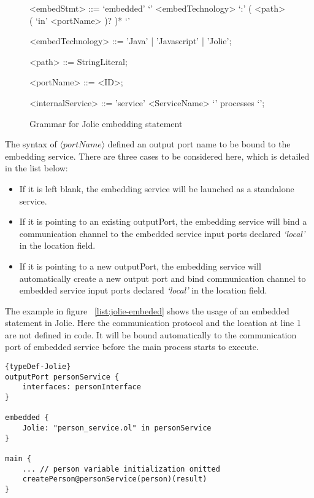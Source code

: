 \begin{figure}[ht]
    \begin{framed}
        \begin{grammar}
            <embedStmt> ::= `embedded' `{' <embedTechnology> `:' ( <path> ( `in' <portName> )? )* `}'

            <embedTechnology> ::= 'Java' | 'Javascript' | 'Jolie';

            <path> ::= StringLiteral;

            <portName> ::= <ID>;

            <internalService>
            ::= 'service' <ServiceName> `{' processes `}';
        \end{grammar}
    \end{framed}
    \caption{Grammar for Jolie embedding statement}
    \label{fig:embedded-syntax}
\end{figure}

The syntax of \(\langle portName \rangle\) defined an output port name to be bound to the embedding service. There are three cases to be considered here, which is detailed in the list below:

\begin{itemize}
    \item If it is left blank, the embedding service will be launched as a standalone service.
    \item If it is pointing to an existing outputPort, the embedding service will bind a communication channel to the embedded service input ports declared \textit{`local'} in the location field.
    \item If it is pointing to a new outputPort, the embedding service will automatically create a new output port and bind communication channel to embedded service input ports declared \textit{`local'} in the location field.
\end{itemize}

The example in figure ~\ref{list:jolie-embeded} shows the usage of an embedded statement in Jolie. Here the communication protocol and the location at line 1 are not defined in code. It will be bound automatically to the communication port of embedded service before the main process starts to execute. 

\begin{listing}[ht]

\lstset{language=Jolie,
    style=codeStyle,
    numbers=left,
    firstnumber=1
}
\begin{lstlisting}[frame=tlrb]{typeDef-Jolie}
outputPort personService {
    interfaces: personInterface
}

embedded {
    Jolie: "person_service.ol" in personService
}

main {
    ... // person variable initialization omitted
    createPerson@personService(person)(result)
}
\end{lstlisting}
\caption{Jolie implementation of the embedded statement}
\label{list:jolie-embeded}
\end{listing}

\FloatBarrier
